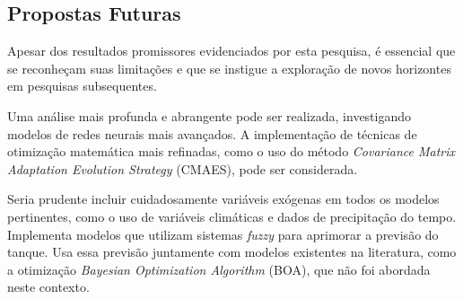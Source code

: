
\subsection{Propostas Futuras}

Apesar dos resultados promissores evidenciados por esta pesquisa, é essencial que se reconheçam suas limitações e que se instigue a exploração de novos horizontes em pesquisas subsequentes.

Uma análise mais profunda e abrangente pode ser realizada, investigando modelos de redes neurais mais avançados. A implementação de técnicas de otimização matemática mais refinadas, como o uso do método \textit{Covariance Matrix Adaptation Evolution Strategy} (CMAES), pode ser considerada. 

Seria prudente incluir cuidadosamente variáveis exógenas em todos os modelos pertinentes, como o uso de variáveis climáticas e dados de precipitação do tempo.
Implementa modelos que utilizam sistemas \textit{fuzzy} para aprimorar a previsão do tanque. Usa essa previsão juntamente com modelos existentes na literatura, como a otimização \textit{Bayesian Optimization Algorithm} (BOA), que não foi abordada neste contexto.



